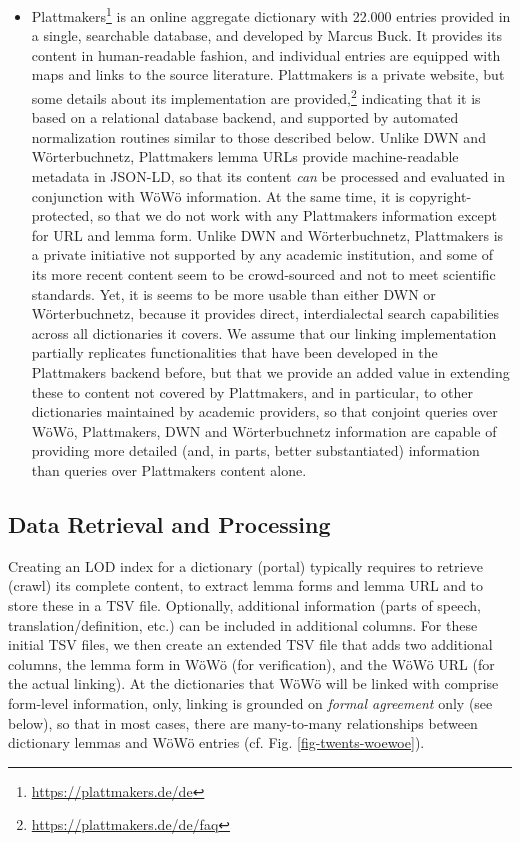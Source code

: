 \documentclass{article}
\begin{document}
\begin{itemize}
\item Plattmakers\footnote{
    \url{https://plattmakers.de/de}
} is an online aggregate dictionary with 22.000 entries provided in a single, searchable database, and developed by Marcus Buck. It provides its content in human-readable fashion, and individual entries are equipped with maps and links to the source literature. Plattmakers is a private website, but some details about its implementation are provided,\footnote{\url{https://plattmakers.de/de/faq}} indicating that it is based on a relational database backend, and supported by automated normalization routines similar to those described below. Unlike DWN and Wörterbuchnetz, Plattmakers lemma URLs provide machine-readable metadata in JSON-LD, so that its content \emph{can} be processed and evaluated in conjunction with WöWö information. At the same time, it is copyright-protected, so that we do not work with any Plattmakers information except for URL and lemma form. Unlike DWN and Wörterbuchnetz, Plattmakers is a private initiative not supported by any academic institution, and some of its more recent content seem to be crowd-sourced and not to meet scientific standards. Yet, it is seems to be more usable than either DWN or Wörterbuchnetz, because it provides direct, interdialectal search capabilities across all dictionaries it covers. We assume that our linking implementation partially replicates functionalities that have been developed in the Plattmakers backend before, but that we provide an added value in extending these to content not covered by Plattmakers, and in particular, to other dictionaries maintained by academic providers, so that conjoint queries over WöWö, Plattmakers, DWN and Wörterbuchnetz information are capable of providing more detailed (and, in parts, better substantiated) information than queries over Plattmakers content alone.
\end{itemize}

\subsection{Data Retrieval and Processing}

Creating an LOD index for a dictionary (portal) typically requires to retrieve (crawl) its complete content, to extract lemma forms and lemma URL and to store these in a TSV file. Optionally, additional information (parts of speech, translation/definition, etc.) can be included in additional columns. For these initial TSV files, we then create an extended TSV file that adds two additional columns, the lemma form in WöWö (for verification), and the WöWö URL (for the actual linking). At the dictionaries that WöWö will be linked with comprise form-level information, only, linking is grounded on \emph{formal agreement} only (see below), so that in most cases, there are many-to-many relationships between dictionary lemmas and WöWö entries (cf. Fig. \ref{fig-twents-woewoe}).
\end{document}
